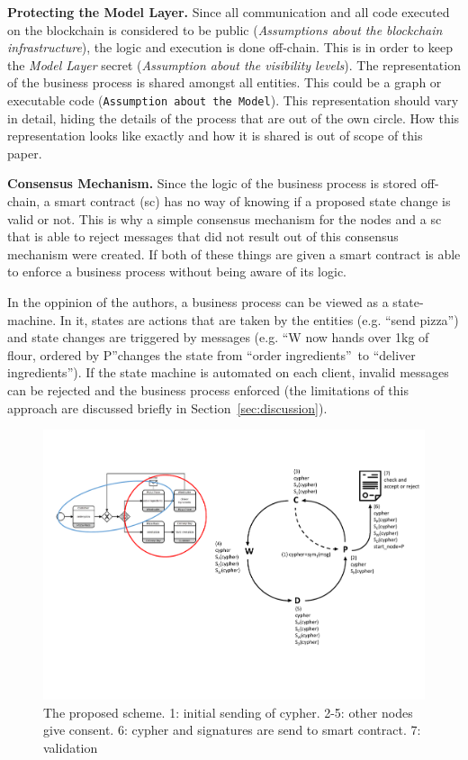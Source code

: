 \documentclass[runningheads]{llncs}
\newcommand{\ber}[1]{\textit{#1}}
\newcommand{\refsec}[1]{Section~\ref{#1}}
\renewcommand{\bigbreak}{}
\newcommand{\quotel}{``}
\newcommand{\quoter}{''}
\begin{document}
\bigbreak
\textbf{Protecting the Model Layer.} Since all communication and all code executed on the blockchain is considered to be public  (\textit{Assumptions about the blockchain infrastructure}), the logic and execution is done off-chain. This is in order to keep the \ber{Model Layer} secret (\textit{Assumption about the visibility levels}). The representation of the business process is shared amongst all entities. This could be a graph or executable code (\texttt{Assumption about the Model}). This representation should vary in detail, hiding the details of the process that are out of the own circle. How this representation looks like exactly and how it is shared is out of scope of this paper.


\bigbreak
\textbf{Consensus Mechanism.} Since the logic of the business process is stored off-chain, a smart contract (sc) has no way of knowing if a proposed state change is valid or not. This is why a simple consensus mechanism for the nodes and a sc that is able to reject messages that did not result out of this consensus mechanism were created. If both of these things are given a smart contract is able to enforce a business process without being aware of its logic. 

In the oppinion of the authors, a business process can be viewed as a state-machine. In it, states are actions that are taken by the entities (e.g. \quotel send pizza\quoter ) and state changes are triggered by messages (e.g. \quotel W now hands over 1kg of flour, ordered by P\quoter  changes the state from \quotel order ingredients\quoter \  to \quotel deliver ingredients\quoter ). If the state machine is automated on each client, invalid messages can be rejected and the business process enforced (the limitations of this approach are discussed briefly in \refsec{sec:discussion}).

\begin{center}
\begin{figure}
    \centering
    \includegraphics[trim=13cm 4cm 0cm 3cm,clip=true,scale=0.5]{schema.pdf}
    \caption{The proposed scheme. 1: initial sending of cypher. 2-5: other nodes give consent. 6: cypher and signatures are send to smart contract. 7: validation} 
    \label{fig:scheme}
\end{figure}
\end{center}
\end{document}
